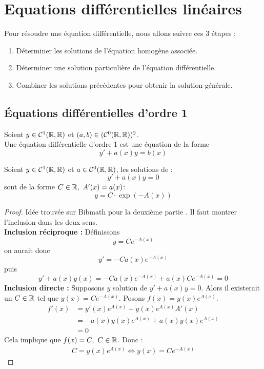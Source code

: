 \chapter{Equations différentielles linéaires}

\noindent Pour résoudre une équation différentielle, nous allons suivre ces 3 étapes :
\begin{enumerate}
	\item Déterminer les solutions de l'équation homogène associée.
	\item Déterminer une solution particulière de l'équation différentielle.
	\item Combiner les solutions précédentes pour obtenir la solution générale.
\end{enumerate}

\section{\'Equations différentielles d'ordre 1}

\begin{definition}
	Soient $y \in \mathcal{C}^1(\mathbb{R},\mathbb{R})$ et $(a, b) \in (\mathcal{C}^0(\mathbb{R},\mathbb{R}))^2$. \\
	Une équation différentielle d'ordre 1 est une équation de la forme
	\[ y' + a(x)y = b(x) \]
\end{definition}

\begin{theorem}
	Soient $y \in \mathcal{C}^1(\mathbb{R}, \mathbb{R})$ et $a \in \mathcal{C}^0(\mathbb{R}, \mathbb{R})$, les solutions de :
	\[ y' + a(x)y = 0 \]
	sont de la forme $C \in \mathbb{R},\ A'(x) = a(x)$:
	\[ y = C \cdot \exp(-A(x)) \]
\end{theorem}

\begin{proof}Idée trouvée sur Bibmath pour la deuxième partie  \cite{bibmath_resolution_eq_diff}.
    Il faut montrer l'inclusion dans les deux sens. \\
    \textbf{Inclusion réciproque :}
	Définissons
	\[ y = C e^{-A(x)} \]
	on aurait donc
	\[ y' = -C a(x)e^{-A(x)} \]
	puis
	\[ y' + a(x)y(x) = -C a(x) e^{-A(x)} + a(x)Ce^{-A(x)} = 0 \]
    \textbf{Inclusion directe :}
    Supposons $y$ solution de $y' + a(x) y = 0$.
    Alors il existerait un $C \in \mathbb{R}$ tel que $y(x) = Ce^{-A(x)}$.
    Posons $f(x) = y(x)e^{A(x)}$.
    \begin{align*}
        f'(x) &= y'(x)e^{A(x)} + y(x)e^{A(x)}A'(x) \\
        &= -a(x)y(x)e^{A(x)} + a(x)y(x)e^{A(x)} \\
        &= 0
    \end{align*}
    Cela implique que $f(x) = C,\ C \in \mathbb{R}$. Donc :
    \begin{align*}
        C = y(x)e^{A(x)} \iff y(x) = Ce^{-A(x)}
    \end{align*}
\end{proof}

